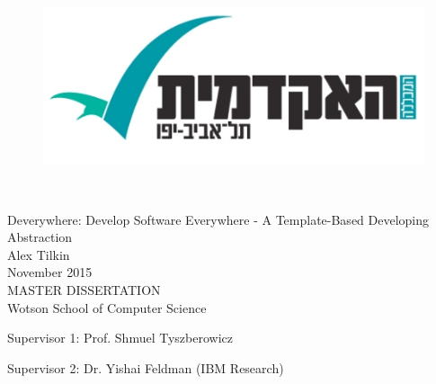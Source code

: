 
\thispagestyle{empty}
\begin{figure}
\centering
\includegraphics[scale=0.4]{./fig/MTALogo}
\end{figure}

\mbox{}\\[6pc]
\begin{center}
\Huge{Deverywhere: Develop Software Everywhere - A Template-Based Developing Abstraction}\\[2pc]

\Large{Alex Tilkin}\\[1pc]
\large{November 2015}\\[2pc]

MASTER DISSERTATION\\
Wotson School of Computer Science\\
\end{center}
\vfill

\noindent Supervisor 1: Prof. Shmuel Tyszberowicz

\noindent Supervisor 2: Dr. Yishai Feldman (IBM Research)

